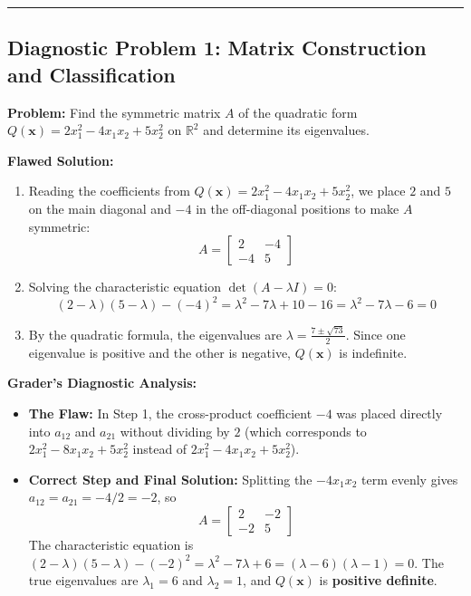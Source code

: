 \documentclass[11pt, letterpaper]{article}
\theoremstyle{definition}
\theoremstyle{remark}
\begin{document}
\medskip\hrule\medskip

\subsection*{Diagnostic Problem 1: Matrix Construction and Classification}
\textbf{Problem:} Find the symmetric matrix $A$ of the quadratic form $Q(\mathbf{x}) = 2x_1^2 - 4x_1x_2 + 5x_2^2$ on $\mathbb{R}^2$ and determine its eigenvalues.

\textbf{Flawed Solution:}
\begin{enumerate}
    \item Reading the coefficients from $Q(\mathbf{x}) = 2x_1^2 - 4x_1x_2 + 5x_2^2$, we place $2$ and $5$ on the main diagonal and $-4$ in the off-diagonal positions to make $A$ symmetric:
    \[
    A = \begin{bmatrix} 2 & -4 \\ -4 & 5 \end{bmatrix}
    \]
    \item Solving the characteristic equation $\det(A - \lambda I) = 0$:
    \[
    (2 - \lambda)(5 - \lambda) - (-4)^2 = \lambda^2 - 7\lambda + 10 - 16 = \lambda^2 - 7\lambda - 6 = 0
    \]
    \item By the quadratic formula, the eigenvalues are $\lambda = \frac{7 \pm \sqrt{73}}{2}$. Since one eigenvalue is positive and the other is negative, $Q(\mathbf{x})$ is indefinite.
\end{enumerate}

\textbf{Grader's Diagnostic Analysis:}
\begin{itemize}
    \item \textbf{The Flaw:} In Step 1, the cross-product coefficient $-4$ was placed directly into $a_{12}$ and $a_{21}$ without dividing by $2$ (which corresponds to $2x_1^2 - 8x_1x_2 + 5x_2^2$ instead of $2x_1^2 - 4x_1x_2 + 5x_2^2$).
    \item \textbf{Correct Step and Final Solution:} Splitting the $-4x_1x_2$ term evenly gives $a_{12} = a_{21} = -4/2 = -2$, so
    \[
    A = \begin{bmatrix} 2 & -2 \\ -2 & 5 \end{bmatrix}
    \]
    The characteristic equation is $(2-\lambda)(5-\lambda) - (-2)^2 = \lambda^2 - 7\lambda + 6 = (\lambda - 6)(\lambda - 1) = 0$. The true eigenvalues are $\lambda_1 = 6$ and $\lambda_2 = 1$, and $Q(\mathbf{x})$ is \textbf{positive definite}.
\end{itemize}
\end{document}

